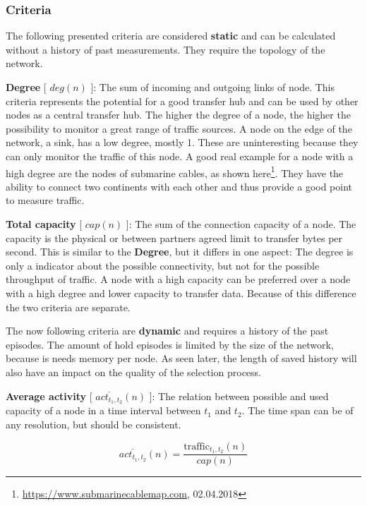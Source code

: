 \documentclass[thesis.tex]{subfiles}
\begin{document}
\subsubsection{Criteria} \label{sec:main:selectionPhase:criteria}
The following presented criteria are considered \textbf{static} and can be calculated without a history of past measurements. They require the topology of the network.

\textbf{Degree} [ $deg(n)$ ]: The sum of incoming and outgoing links of node. This criteria represents the potential for a good transfer hub and can be used by other nodes as a central transfer hub. The higher the degree of a node, the higher the possibility to monitor a great range of traffic sources. A node on the edge of the network, a sink, has a low degree, mostly 1. These are uninteresting because they can only monitor the traffic of this node. A good real example for a node with a high degree are the nodes of submarine cables, as shown here\footnote{\url{https://www.submarinecablemap.com}, 02.04.2018}. They have the ability to connect two continents with each other and thus provide a good point to measure traffic.

\textbf{Total capacity} [ $cap(n)$ ]: The sum of the connection capacity of a node. The capacity is the physical or between partners agreed limit to transfer bytes per second. This is similar to the \textbf{Degree}, but it differs in one aspect: The degree is only a indicator about the possible connectivity, but not for the possible throughput of traffic. A node with a high capacity can be preferred over a node with a high degree and lower capacity to transfer data. Because of this difference the two criteria are separate.

The now following criteria are \textbf{dynamic} and requires a history of the past episodes. The amount of hold episodes is limited by the size of the network, because is needs memory per node. As seen later, the length of saved history will also have an impact on the quality of the selection process.

\textbf{Average activity} [ $\overline{act_{t_1,t_2}}(n)$ ]: The relation between possible and used capacity of a node in a time interval between $t_1$ and $t_2$. The time span can be of any resolution, but should be consistent. 

\begin{equation}
\overline{act_{t_1,t_2}}(n) = \frac{\text{traffic}_{t_1,t_2}(n)}{cap(n)}
\end{equation}
\end{document}
